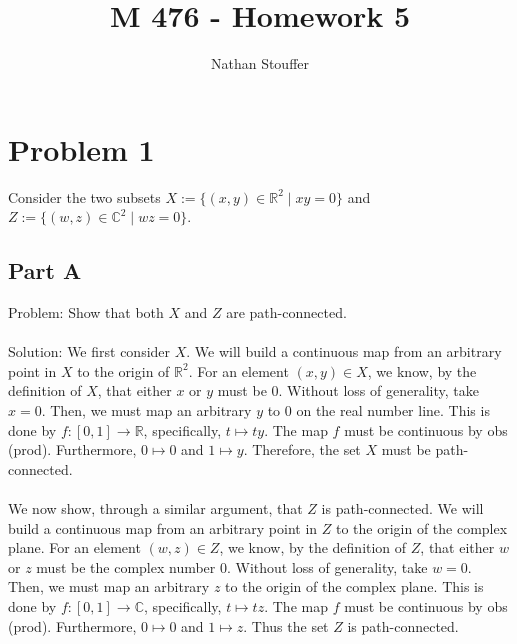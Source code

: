 \documentclass{article}
\begin{document}
\title{M 476 - Homework 5}
\author{Nathan Stouffer}

\maketitle
\newpage

\section*{Problem 1}
Consider the two subsets
$X := \{ (x,y) \in \mathbb{R}^2 \mid xy = 0 \}$
and
$Z := \{ (w,z) \in \mathbb{C}^2 \mid wz = 0 \}$.
\subsection*{Part A}
Problem: Show that both $X$ and $Z$ are path-connected. \\\\
Solution: We first consider $X$. We will build a continuous map from an arbitrary point in $X$ to the origin of $\mathbb{R}^2$.
For an element $(x,y) \in X$, we know, by the definition of $X$, that either $x$ or $y$ must be 0.
Without loss of generality, take $x = 0$.
Then, we must map an arbitrary $y$ to 0 on the real number line. This is done by
$f: [0,1] \to \mathbb{R}$,
specifically,
$t \mapsto ty$.
The map $f$ must be continuous by obs (prod).
Furthermore,
$0 \mapsto 0$ and $1 \mapsto y$.
Therefore, the set $X$ must be path-connected. \\\\
We now show, through a similar argument, that $Z$ is path-connected. We will build a continuous map from an arbitrary point in $Z$ to the origin of the complex plane.
For an element $(w,z) \in Z$, we know, by the definition of $Z$, that either $w$ or $z$ must be the complex number 0.
Without loss of generality, take $w = 0$.
Then, we must map an arbitrary $z$ to the origin of the complex plane. This is done by
$f: [0,1] \to \mathbb{C}$,
specifically,
$t \mapsto tz$.
The map $f$ must be continuous by obs (prod).
Furthermore,
$0 \mapsto 0$ and $1 \mapsto z$.
Thus the set $Z$ is path-connected.
\end{document}
